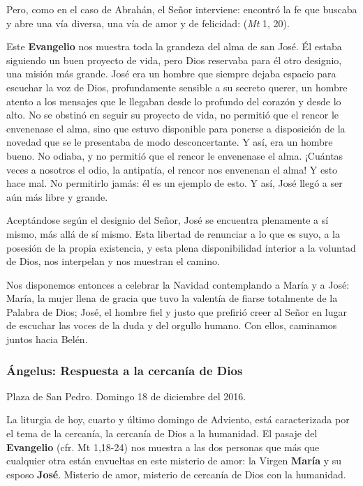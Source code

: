 Pero, como en el caso de Abrahán, el Señor interviene: encontró la fe que buscaba y abre una vía diversa, una vía de amor y de felicidad:  (\emph{Mt} 1, 20).

Este \textbf{Evangelio} nos muestra toda la grandeza del alma de san José. Él estaba siguiendo un buen proyecto de vida, pero Dios reservaba para él otro designio, una misión más grande. José era un hombre que siempre dejaba espacio para escuchar la voz de Dios, profundamente sensible a su secreto querer, un hombre atento a los mensajes que le llegaban desde lo profundo del corazón y desde lo alto. No se obstinó en seguir su proyecto de vida, no permitió que el rencor le envenenase el alma, sino que estuvo disponible para ponerse a disposición de la novedad que se le presentaba de modo desconcertante. Y así, era un hombre bueno. No odiaba, y no permitió que el rencor le envenenase el alma. ¡Cuántas veces a nosotros el odio, la antipatía, el rencor nos envenenan el alma! Y esto hace mal. No permitirlo jamás: él es un ejemplo de esto. Y así, José llegó a ser aún más libre y grande.

Aceptándose según el designio del Señor, José se encuentra plenamente a sí mismo, más allá de sí mismo. Esta libertad de renunciar a lo que es suyo, a la posesión de la propia existencia, y esta plena disponibilidad interior a la voluntad de Dios, nos interpelan y nos muestran el camino.

Nos disponemos entonces a celebrar la Navidad contemplando a María y a José: María, la mujer llena de gracia que tuvo la valentía de fiarse totalmente de la Palabra de Dios; José, el hombre fiel y justo que prefirió creer al Señor en lugar de escuchar las voces de la duda y del orgullo humano. Con ellos, caminamos juntos hacia Belén.

\subsubsection{Ángelus: Respuesta a la cercanía de Dios}

Plaza de San Pedro. Domingo 18 de diciembre del 2016.

La liturgia de hoy, cuarto y último domingo de Adviento, está caracterizada por el tema de la cercanía, la cercanía de Dios a la humanidad. El pasaje del \textbf{Evangelio} (cfr. Mt 1,18-24) nos muestra a las dos personas que más que cualquier otra están envueltas en este misterio de amor: la Virgen \textbf{María} y su esposo \textbf{José}. Misterio de amor, misterio de cercanía de Dios con la humanidad.

